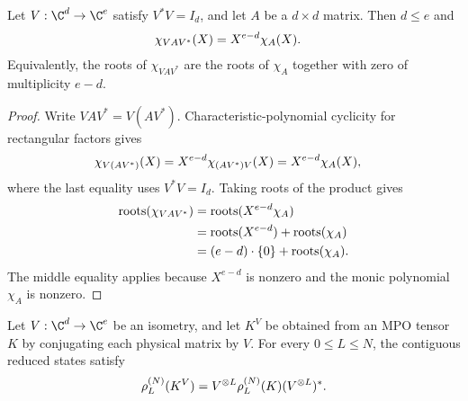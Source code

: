 \begin{lemma}
    \label{thm:matrix_single_kraus_isometry_charpoly}
    \leanok
    Let $V:\C^d\to\C^e$ satisfy $V^*V=I_d$, and let $A$ be a $d\times d$
    matrix. Then $d\leq e$ and
    \begin{align}
        \chi_{VAV^*}(X) & =X^{e-d}\chi_A(X).
        \notag
    \end{align}
    Equivalently, the roots of $\chi_{VAV^*}$ are the roots of $\chi_A$
    together with zero of multiplicity $e-d$.
\end{lemma}

\begin{proof}\leanok
    Write $VAV^*=V(AV^*)$. Characteristic-polynomial cyclicity for rectangular
    factors gives
    \begin{align}
        \chi_{V(AV^*)}(X)
         & =X^{e-d}\chi_{(AV^*)V}(X)
        =X^{e-d}\chi_A(X),
        \notag
    \end{align}
    where the last equality uses $V^*V=I_d$. Taking roots of the product gives
    \begin{align}
        \operatorname{roots}(\chi_{VAV^*})
         & =\operatorname{roots}(X^{e-d}\chi_A)                        \\
         & =\operatorname{roots}(X^{e-d})+\operatorname{roots}(\chi_A) \\
         & =(e-d)\cdot\{0\}+\operatorname{roots}(\chi_A).
        \notag
    \end{align}
    The middle equality applies because $X^{e-d}$ is nonzero and the monic
    polynomial $\chi_A$ is nonzero.
\end{proof}

\begin{lemma}
    \label{thm:mpdo_reduced_state_physical_isometry_transport}
    \leanok
    Let $V:\C^d\to\C^e$ be an isometry, and let $K^V$ be obtained from an MPO
    tensor $K$ by conjugating each physical matrix by $V$.  For every
    $0\leq L\leq N$, the contiguous reduced states satisfy
    \begin{align}
        \rho_L^{(N)}(K^V)=V^{\otimes L}\rho_L^{(N)}(K)(V^{\otimes L})^*.
        \notag
    \end{align}
\end{lemma}


